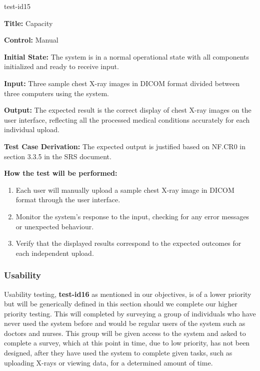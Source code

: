 \documentclass[12pt, titlepage]{article}
\begin{document}
\begin{itemize}
    \begin{item}
        test-id15
        \begin{mdframed}[linewidth=0.5mm]
            \textbf{Title:} Capacity \par
            \textbf{Control:} Manual \par
            \textbf{Initial State:} The system is in a normal operational state with all components initialized and ready to receive input. \par
            \textbf{Input:} Three sample chest X-ray images in DICOM format divided between three computers using the system. \par
            \textbf{Output:} The expected result is the correct display of chest X-ray images on the user interface, reflecting all the processed medical conditions accurately for each individual upload.  \par
            \textbf{Test Case Derivation:} The expected output is justified based on NF.CR0 in section 3.3.5 in the SRS document. \par
            \textbf{How the test will be performed:}
            \begin{enumerate}[noitemsep]
                \item Each user will manually upload a sample chest X-ray image in DICOM format through the user interface.
                \item Monitor the system's response to the input, checking for any error messages or unexpected behaviour.
                \item Verify that the displayed results correspond to the expected outcomes for each independent upload.
            \end{enumerate}
        \end{mdframed}
    \end{item}
\end{itemize}

\subsubsection{Usability}
\noindent Usability testing, \textbf{test-id16} as mentioned in our objectives, is of a lower priority but will be generically defined in this section should we complete our higher priority testing. This will completed by surveying a group of individuals who have never used the system before and would be regular users of the system such as doctors and nurses. This group will be given access to the system and asked to complete a survey, which at this point in time, due to low priority, has not been designed, after they have used the system to complete given tasks, such as uploading X-rays or viewing data, for a determined amount of time.
\end{document}
